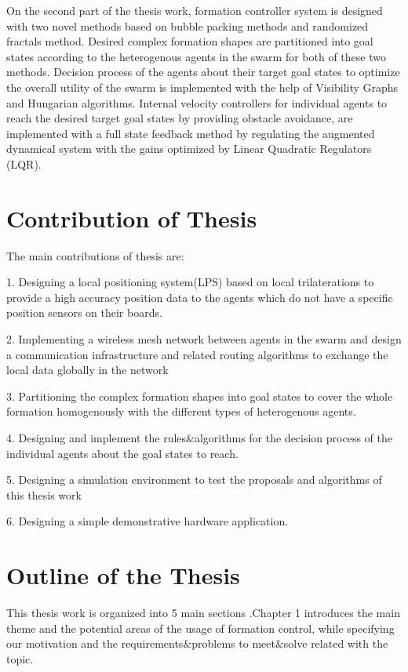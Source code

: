 On the second part of the thesis work, formation controller system is designed with two novel methods based on bubble packing methods and randomized fractals method. Desired complex formation shapes are partitioned into goal states according to the heterogenous agents in the swarm for both of these two methods. Decision process of the agents about their target goal states to optimize the overall utility of the swarm is implemented with the help of Visibility Graphs and Hungarian algorithms. Internal velocity controllers for individual agents to reach the desired target goal states by providing obstacle avoidance, are implemented with a full state feedback method by regulating the augmented dynamical system with the gains optimized by Linear Quadratic Regulators (LQR).

\section{Contribution of Thesis}
The main contributions of thesis are:

1. Designing a local positioning system(LPS) based on local trilaterations to provide a high accuracy position data to the agents which do not have a specific position sensors on their boards.

2. Implementing a wireless mesh network between agents in the swarm and design a communication infrastructure and related routing algorithms to exchange the local data globally in the network

3. Partitioning the complex formation shapes into goal states to cover the whole formation homogenously with the different types of heterogenous agents.

4. Designing and implement the rules$\&$algorithms for the decision process of the individual agents about the goal states to reach.

5. Designing a simulation environment to test the proposals and algorithms of this thesis work

6. Designing a simple demonstrative hardware application.

\section{Outline of the Thesis}
This thesis work is organized into 5 main sections .Chapter 1 introduces the main theme and the potential areas of the usage of formation control, while specifying our motivation and the requirements$\&$problems to meet$\&$solve related with the topic.

